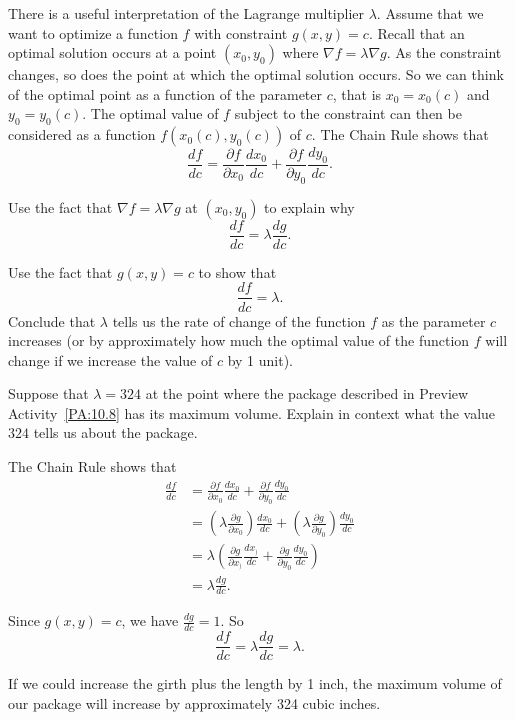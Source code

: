 \begin{exercises}
\item There is a useful interpretation of the Lagrange multiplier $\lambda$. Assume that we want to optimize a function $f$ with constraint $g(x,y)=c$. Recall that an optimal solution occurs at a point $(x_0, y_0)$ where $\nabla f = \lambda \nabla g$. As the constraint changes, so does the point at which the optimal solution occurs. So we can think of the optimal point as a function of the parameter $c$, that is $x_0 = x_0(c)$ and $y_0=y_0(c)$. The optimal value of $f$ subject to the constraint can then be considered as a function $f(x_0(c), y_0(c))$ of $c$. The Chain Rule shows that 
\[\frac{df}{dc} = \frac{\partial f}{\partial x_0} \frac{dx_0}{dc} + \frac{\partial f}{\partial y_0} \frac{dy_0}{dc}.\]
	\ba
	\item Use the fact that $\nabla f = \lambda \nabla g$ at $(x_0,y_0)$ to explain why  
\[\frac{df}{dc} = \lambda \frac{dg}{dc}.\]
	\item Use the fact that $g(x,y) = c$ to show that 
	\[\frac{df}{dc} = \lambda.\]
Conclude that $\lambda$ tells us the rate of change of the function $f$ as the parameter $c$ increases (or by approximately how much the optimal value of the function $f$ will change if we increase the value of $c$ by 1 unit). 
\item Suppose that $\lambda = 324$ at the point where the package described in Preview Activity~\ref{PA:10.8} has its maximum volume. Explain in context what the value $324$ tells us about the package.
	\ea
	
\begin{exerciseSolution} 
\ba
\item The Chain Rule shows that 
\begin{align*}
\frac{df}{dc} &= \frac{\partial f}{\partial x_0} \frac{dx_0}{dc} + \frac{\partial f}{\partial y_0} \frac{dy_0}{dc} \\
	&= \left(\lambda \frac{\partial g}{\partial x_0} \right) \frac{dx_0}{dc} + \left(\lambda \frac{\partial g}{\partial y_0} \right) \frac{dy_0}{dc} \\
	&= \lambda \left(\frac{\partial g}{\partial x_)} \frac{dx_)}{dc} + \frac{\partial g}{\partial y_0} \frac{dy_0}{dc} \right) \\
	&= \lambda \frac{dg}{dc}.
\end{align*}
\item Since $g(x,y)=c$, we have $\frac{dg}{dc} = 1$. So 
\[\frac{df}{dc}	= \lambda \frac{dg}{dc} = \lambda.\]
\item  If we could increase the girth plus the length by 1 inch, the maximum volume of our package will increase by approximately 324 cubic inches.
\ea
\end{exerciseSolution}



\end{exercises}
\afterexercises
